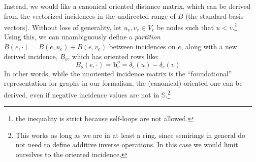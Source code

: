 \documentclass[%
	12pt,
		oneside,
		letterpaper
]{book}
\begin{document}
Instead, we would like a canonical oriented distance matrix, which can be derived from the vectorized incidences in the undirected range of \(B\) (the standard basis vectors).
Without loss of generality, let \(u_e,v_e\in V_e\) be nodes such that \(u<v\).\footnote{the inequality is strict because self-loops are not allowed.}
Using this, we can unambiguously define a \emph{partition} \(B(e,\cdot)=B(e,u_e) + B(e,v_e)\) between incidences on \(e\), along with a new derived incidence, \(B_o\), which has oriented rows like:
\[B_o(e,\cdot)=\mathbf{b}^o_e = \delta_e(u)-\delta_e(v)\]
In other words, while the unoriented incidence matrix is the ``foundational'' representation for graphs in our formalism, the (canonical) oriented one can be derived, even if negative incidence values are not in \(\mathbb{S}\).\footnote{
  This works as long as we are in at least a ring, since semirings in general do not need to define additive inverse operations.
  In this case we would limit ourselves to the oriented incidence.}
\end{document}
